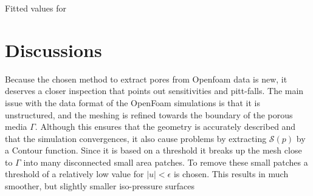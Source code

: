 \documentclass[draft]{agujournal2019}
\begin{document}
Fitted values for


\begin{table}[htbp!]
\caption{Summary of the geometrical and fitting parameters}
\end{table}





\section{Discussions}

Because the chosen method to extract pores from Openfoam data is new, it deserves a closer inspection that points out sensitivities and pitt-falls. 
The main issue with the data format of the OpenFoam simulations is that it is unstructured, and the meshing is refined towards the boundary of the porous media $\Gamma$. Although this ensures that the geometry is accurately described and that the simulation convergences, it also cause problems by extracting $\mathcal{S}(p)$ by a Contour function. Since it is based on a threshold it breaks up the mesh close to $\Gamma$ into many disconnected small area patches. To remove these small patches a threshold of a relatively low value for $\left|u\right|< \epsilon$ is chosen. This results in much smoother, but slightly smaller iso-pressure surfaces 
\end{document}
